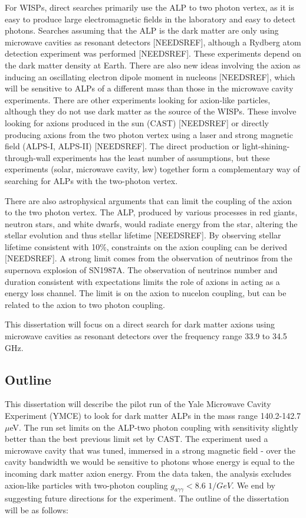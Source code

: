 \documentclass[11pt]{book}
\begin{document}
For WISPs, direct searches primarily use the ALP to two photon vertex, as it is easy to produce large electromagnetic fields in the laboratory and easy to detect photons. Searches assuming that the ALP is the dark matter are only using microwave cavities as resonant detectors [NEEDSREF], although a Rydberg atom detection experiment was performed [NEEDSREF]. These experiments depend on the dark matter density at Earth. There are also new ideas involving the axion as inducing an oscillating electron dipole moment in nucleons [NEEDSREF], which will be sensitive to  ALPs of a different mass than those in the microwave cavity experiments. There are other experiments looking for axion-like particles, although they do not use dark matter as the source of the WISPs. These involve looking for axions produced in the sun (CAST) [NEEDSREF] or directly producing axions from the two photon vertex using a laser and strong magnetic field (ALPS-I, ALPS-II) [NEEDSREF]. The direct production or light-shining-through-wall experiments has the least number of assumptions, but these experiments (solar, microwave cavity, lsw) together form a complementary way of searching for ALPs with the two-photon vertex.

There are also astrophysical arguments that can limit the coupling of the axion to the two photon vertex. The ALP, produced by various processes in red giants, neutron stars, and white dwarfs, would radiate energy from the star, altering the stellar evolution and thus stellar lifetime [NEEDSREF]. By observing stellar lifetime consistent with 10$\%$, constraints on the axion coupling can be derived [NEEDSREF]. A strong limit comes from the observation of neutrinos from the supernova explosion of SN1987A. The observation of neutrinos number and duration consistent with expectations limits the role of axions in acting as a energy loss channel. The limit is on the axion to nucelon coupling, but can be related to the axion to two photon coupling.

This dissertation will focus on a direct search for dark matter axions using microwave cavities as resonant detectors over the frequency range 33.9 to 34.5 GHz.

\subsection{Outline}

This dissertation will describe the pilot run of the Yale Microwave Cavity Experiment (YMCE) to look for dark matter ALPs in the mass range 140.2-142.7 $\mu$eV. The run set limits on the ALP-two photon coupling with sensitivity slightly better than the best previous limit set by CAST. The experiment used a microwave cavity that was tuned, immersed in a strong magnetic field - over the cavity bandwidth we would be sensitive to photons whose energy is equal to the incoming dark matter axion energy.  From the data taken, the analysis excludes axion-like particles with two-photon coupling $g_{a\gamma\gamma} < 8.6$ $1/GeV$. We end by suggesting future directions for the experiment.
The outline of the dissertation will be as follows:
\end{document}
